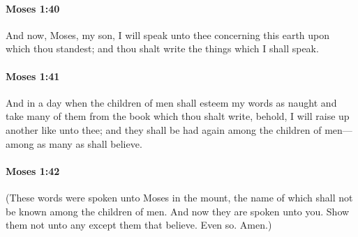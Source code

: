		\paragraph{Moses 1:40} %
			\label{MOSES-1-40}

			And now, Moses, my son, I will speak unto thee concerning this earth upon which thou standest; and thou shalt write the things which I shall speak.


		\paragraph{Moses 1:41} %
			\label{MOSES-1-41}

			And in a day when the children of men shall esteem my words as naught and take many of them from the book which thou shalt write, behold, I will raise up another like unto thee; and they shall be had again among the children of men---among as many as shall believe.


		\paragraph{Moses 1:42} %
			\label{MOSES-1-42}

			(These words were spoken unto Moses in the mount, the name of which shall not be known among the children of men. And now they are spoken unto you. Show them not unto any except them that believe. Even so. Amen.)

			
